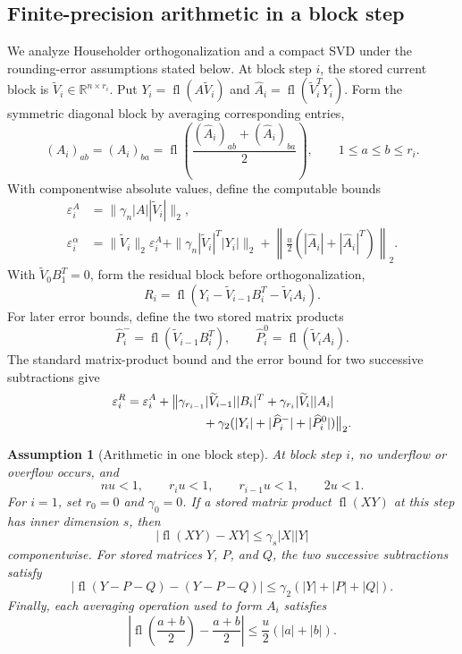 \documentclass[11pt]{article}
\newtheorem{assumption}{Assumption}
\theoremstyle{definition}
\newcommand{\fl}{\operatorname{fl}}
\newcommand{\R}{\mathbb{R}}
\newcommand{\eps}{\varepsilon}
\begin{document}
\subsection{Finite-precision arithmetic in a block step}

We analyze Householder orthogonalization and a compact SVD under the
rounding-error assumptions stated below.
At block step $i$, the stored current block is
$\widetilde V_i\in\R^{n\times r_i}$.  Put
$Y_i=\fl(A\widetilde V_i)$ and
$\widehat A_i=\fl(\widetilde V_i^TY_i)$.  Form the symmetric diagonal block by
averaging corresponding entries,
\[
 (A_i)_{ab}=(A_i)_{ba}
 =\fl\!\left(\frac{(\widehat A_i)_{ab}+(\widehat A_i)_{ba}}{2}\right),
 \qquad 1\le a\le b\le r_i.
\]
With componentwise absolute values, define the computable bounds
\begin{align}
 \eps_i^A&=\|\gamma_n|A||\widetilde V_i|\|_2,
 \label{eq:matvec-error-bound}\\
 \eps_i^\alpha&=
 \|\widetilde V_i\|_2\eps_i^A
 +\|\gamma_n|\widetilde V_i|^T|Y_i|\|_2
 +\left\|\frac{u}{2}
   (|\widehat A_i|+|\widehat A_i|^T)\right\|_2.
 \label{eq:alpha-error-bound}
\end{align}
With $\widetilde V_0B_1^T=0$, form the residual block before orthogonalization,
\begin{equation}
 R_i=\fl\!\left(
  Y_i-\widetilde V_{i-1}B_i^T-\widetilde V_iA_i\right).
 \label{eq:raw-block-residual}
\end{equation}
For later error bounds, define the two stored matrix products
\[
 \widehat P_i^-=\fl(\widetilde V_{i-1}B_i^T),
 \qquad
 \widehat P_i^0=\fl(\widetilde V_iA_i).
\]
The standard matrix-product bound and the error bound for two successive
subtractions give
\begin{equation}
\begin{split}
 \eps_i^R={}&\eps_i^A+
 \bigl\|\gamma_{r_{i-1}}|\widetilde V_{i-1}||B_i|^T
       +\gamma_{r_i}|\widetilde V_i||A_i|\\
 &\hspace{17mm}+\gamma_2(
       |Y_i|+|\widehat P_i^-|+|\widehat P_i^0|)\bigr\|_2.
\end{split}
\label{eq:raw-error-bound}
\end{equation}

\begin{assumption}[Arithmetic in one block step]
\label{ass:block-arithmetic}
At block step $i$, no underflow or overflow occurs, and
\[
 n u<1,\qquad r_i u<1,\qquad r_{i-1}u<1,\qquad 2u<1.
\]
For $i=1$, set $r_0=0$ and $\gamma_0=0$.  If a stored matrix product
$\fl(XY)$ at this step has inner dimension $s$, then
\[
 |\fl(XY)-XY|\le\gamma_s|X||Y|
\]
componentwise.  For stored matrices $Y$, $P$, and $Q$, the two successive
subtractions satisfy
\[
 |\fl(Y-P-Q)-(Y-P-Q)|
 \le\gamma_2(|Y|+|P|+|Q|).
\]
Finally, each averaging operation used to form $A_i$ satisfies
\[
 \left|\fl\!\left(\frac{a+b}{2}\right)-\frac{a+b}{2}\right|
 \le\frac{u}{2}(|a|+|b|).
\]
\end{assumption}
\end{document}
